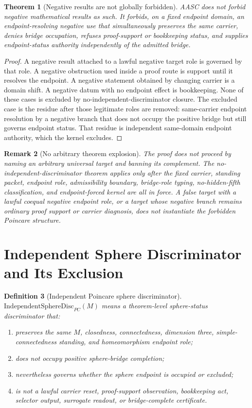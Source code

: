 \documentclass[11pt]{article}
\newtheorem{theorem}{Theorem}[section]
\newtheorem{definition}[theorem]{Definition}
\newtheorem{remark}[theorem]{Remark}
\newcommand{\IndependentSphereDisc}{\mathrm{IndependentSphereDisc}_{PC}}
\begin{document}
\begin{theorem}[Negative results are not globally forbidden]\label{thm:negative-not-globally-forbidden}
AASC does not forbid negative mathematical results as such. It forbids, on a fixed endpoint domain, an endpoint-resolving negative use that simultaneously preserves the same carrier, denies bridge occupation, refuses proof-support or bookkeeping status, and supplies endpoint-status authority independently of the admitted bridge.
\end{theorem}
\begin{proof}
A negative result attached to a lawful negative target role is governed by that role. A negative obstruction used inside a proof route is support until it resolves the endpoint. A negative statement obtained by changing carrier is a domain shift. A negative datum with no endpoint effect is bookkeeping. None of these cases is excluded by no-independent-discriminator closure. The excluded case is the residue after those legitimate roles are removed: same-carrier endpoint resolution by a negative branch that does not occupy the positive bridge but still governs endpoint status. That residue is independent same-domain endpoint authority, which the kernel excludes.
\end{proof}

\begin{remark}[No arbitrary theorem explosion]\label{rem:no-explosion}
The proof does not proceed by naming an arbitrary universal target and banning its complement. The no-independent-discriminator theorem applies only after the fixed carrier, standing packet, endpoint role, admissibility boundary, bridge-role typing, no-hidden-fifth classification, and endpoint-forced kernel are all in force. A false target with a lawful coequal negative endpoint role, or a target whose negative branch remains ordinary proof support or carrier diagnosis, does not instantiate the forbidden Poincare structure.
\end{remark}

\section{Independent Sphere Discriminator and Its Exclusion}\label{sec:independent-disc}

\begin{definition}[Independent Poincare sphere discriminator]
\(\IndependentSphereDisc(M)\) means a theorem-level sphere-status discriminator that:
\begin{enumerate}[label=(\alph*)]
\item preserves the same \(M\), closedness, connectedness, dimension three, simple-connectedness standing, and homeomorphism endpoint role;
\item does not occupy positive sphere-bridge completion;
\item nevertheless governs whether the sphere endpoint is occupied or excluded;
\item is not a lawful carrier reset, proof-support observation, bookkeeping act, selector output, surrogate readout, or bridge-complete certificate.
\end{enumerate}
\end{definition}
\end{document}
